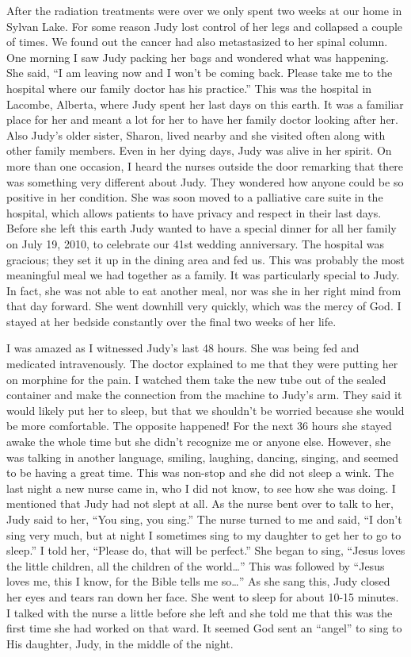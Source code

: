 \documentclass[oneside]{book}
\begin{document}
After the radiation treatments were over we only spent two weeks at our home in Sylvan Lake. For some reason Judy lost control of her legs and collapsed a couple of times. We found out the cancer had also metastasized to her spinal column. One morning I saw Judy packing her bags and wondered what was happening. She said, “I am leaving now and I won’t be coming back. Please take me to the hospital where our family doctor has his practice.” This was the hospital in Lacombe, Alberta, where Judy spent her last days on this earth. It was a familiar place for her and meant a lot for her to have her family doctor looking after her. Also Judy’s older sister, Sharon, lived nearby and she visited often along with other family members. Even in her dying days, Judy was alive in her spirit. On more than one occasion, I heard the nurses outside the door remarking that there was something very different about Judy. They wondered how anyone could be so positive in her condition. She was soon moved to a palliative care suite in the hospital, which allows patients to have privacy and respect in their last days. Before she left this earth Judy wanted to have a special dinner for all her family on July 19, 2010, to celebrate our 41st wedding anniversary. The hospital was gracious; they set it up in the dining area and fed us. This was probably the most meaningful meal we had together as a family. It was particularly special to Judy. In fact, she was not able to eat another meal, nor was she in her right mind from that day forward. She went downhill very quickly, which was the mercy of God. I stayed at her bedside constantly over the final two weeks of her life. 

I was amazed as I witnessed Judy’s last 48 hours. She was being fed and medicated intravenously. The doctor explained to me that they were putting her on morphine for the pain. I watched them take the new tube out of the sealed container and make the connection from the machine to Judy’s arm. They said it would likely put her to sleep, but that we shouldn’t be worried because she would be more comfortable. The opposite happened! For the next 36 hours she stayed awake the whole time but she didn’t recognize me or anyone else. However, she was talking in another language, smiling, laughing, dancing, singing, and seemed to be having a great time. This was non-stop and she did not sleep a wink. The last night a new nurse came in, who I did not know, to see how she was doing. I mentioned that Judy had not slept at all. As the nurse bent over to talk to her, Judy said to her, “You sing, you sing.” The nurse turned to me and said, “I don’t sing very much, but at night I sometimes sing to my daughter to get her to go to sleep.” I told her, “Please do, that will be perfect.” She began to sing, “Jesus loves the little children, all the children of the world…” This was followed by “Jesus loves me, this I know, for the Bible tells me so…” As she sang this, Judy closed her eyes and tears ran down her face. She went to sleep for about 10-15 minutes. I talked with the nurse a little before she left and she told me that this was the first time she had worked on that ward. It seemed God sent an “angel” to sing to His daughter, Judy, in the middle of the night. 
\end{document}
